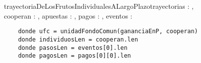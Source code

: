 \documentclass[document.tex]{subfiles}
\begin{document}
\begin{proc}{trayectoriaDeLosFrutosIndividualesALargoPlazo}{\Inout trayectorias : \TLista{\TLista{\float}},\\ \In cooperan : \TLista{\bool}, \In apuestas : \TLista{\TLista{\float}}, \In pagos : \TLista{\TLista{\float}}, \In eventos : \TLista{\TLista{\nat}}}{}

\begin{verbatim}
    donde ufc = unidadFondoComun(gananciaEnP, cooperan)
    donde individuosLen = cooperan.len
    donde pasosLen = eventos[0].len
    donde pagosLen = pagos[0][0].len
\end{verbatim}
\end{proc}
\end{document}
